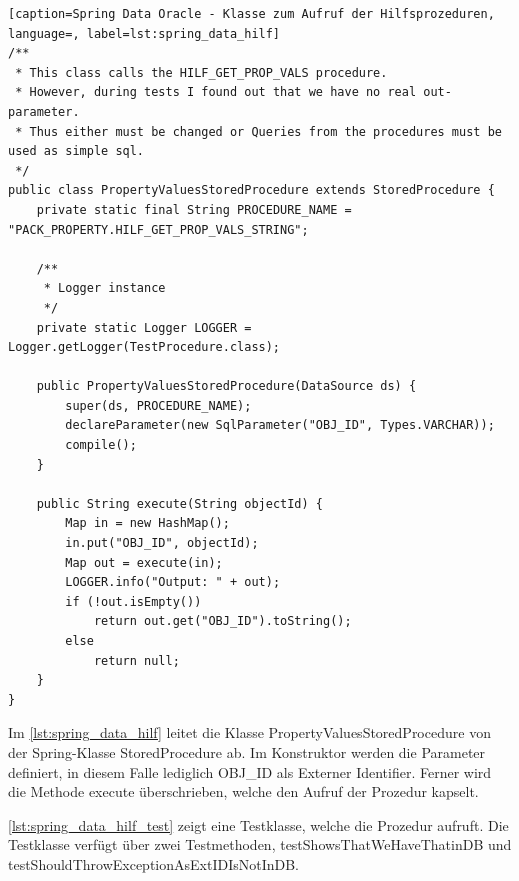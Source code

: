 \begin{lstlisting}[caption=Spring Data Oracle - Klasse zum Aufruf der Hilfsprozeduren, language=, label=lst:spring_data_hilf]
/**
 * This class calls the HILF_GET_PROP_VALS procedure.
 * However, during tests I found out that we have no real out-parameter.
 * Thus either must be changed or Queries from the procedures must be used as simple sql.
 */
public class PropertyValuesStoredProcedure extends StoredProcedure {
    private static final String PROCEDURE_NAME = "PACK_PROPERTY.HILF_GET_PROP_VALS_STRING";

    /**
     * Logger instance
     */
    private static Logger LOGGER = Logger.getLogger(TestProcedure.class);

    public PropertyValuesStoredProcedure(DataSource ds) {
        super(ds, PROCEDURE_NAME);
        declareParameter(new SqlParameter("OBJ_ID", Types.VARCHAR));
        compile();
    }

    public String execute(String objectId) {
        Map in = new HashMap();
        in.put("OBJ_ID", objectId);
        Map out = execute(in);
        LOGGER.info("Output: " + out);
        if (!out.isEmpty())
            return out.get("OBJ_ID").toString();
        else
            return null;
    }
}
\end{lstlisting}

Im \autoref{lst:spring_data_hilf} leitet die Klasse PropertyValuesStoredProcedure von der Spring-Klasse StoredProcedure ab. Im Konstruktor werden die Parameter definiert, in diesem Falle lediglich OBJ\_ID als Externer Identifier. Ferner wird die Methode execute überschrieben, welche den Aufruf der Prozedur kapselt. 

\autoref{lst:spring_data_hilf_test} zeigt eine Testklasse, welche die Prozedur aufruft. Die Testklasse verfügt über zwei Testmethoden, testShowsThatWeHaveThatinDB und testShouldThrowExceptionAsExtIDIsNotInDB. 

